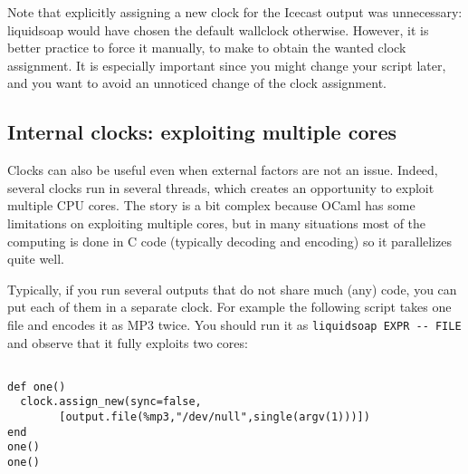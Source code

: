 Note that explicitly assigning a new clock for the Icecast
output was unnecessary: liquidsoap would have chosen the default
wallclock otherwise. However, it is better practice to force
it manually, to make to obtain the wanted clock assignment.
It is especially important since you might change your script
later, and you want to avoid an unnoticed change of the
clock assignment.

\subsection{Internal clocks: exploiting multiple cores}
Clocks can also be useful even when external factors are not an issue.
Indeed, several clocks run in several threads, which creates an opportunity
to exploit multiple CPU cores.
The story is a bit complex because OCaml has some limitations on
exploiting multiple cores, but in many situations most of the computing
is done in C code (typically decoding and encoding) so it parallelizes
quite well.

Typically, if you run several outputs that do not share much (any) code,
you can put each of them in a separate clock.
For example the following script takes one file and encodes it as MP3
twice. You should run it as \verb+liquidsoap EXPR -- FILE+
and observe that it fully exploits two cores:

\begin{verbatim}

def one()
  clock.assign_new(sync=false,
        [output.file(%mp3,"/dev/null",single(argv(1)))])
end
one()
one()
\end{verbatim}
